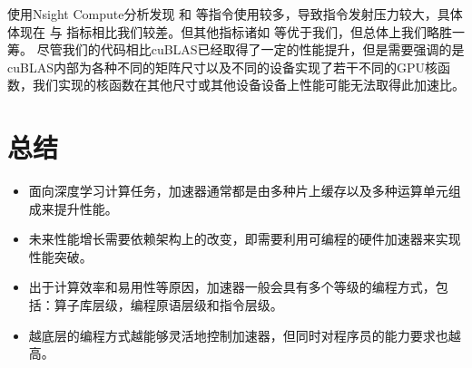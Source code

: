 \documentclass[letterpaper,10pt,english]{sphinxmanual}
\begin{document}
\begin{sphinxVerbatim}[commandchars=\\\{\}]
  
      
\end{sphinxVerbatim}

\sphinxAtStartPar
使用Nsight Compute分析发现  和 
等指令使用较多，导致指令发射压力较大，具体体现在  与
 指标相比我们较差。但其他指标诸如
 等优于我们，但总体上我们略胜一筹。
尽管我们的代码相比cuBLAS已经取得了一定的性能提升，但是需要强调的是cuBLAS内部为各种不同的矩阵尺寸以及不同的设备实现了若干不同的GPU核函数，我们实现的核函数在其他尺寸或其他设备设备上性能可能无法取得此加速比。


\section{总结}
\label{\detokenize{chapter_accelerator/summary:id1}}\label{\detokenize{chapter_accelerator/summary::doc}}\begin{itemize}
\item {} 
\sphinxAtStartPar
面向深度学习计算任务，加速器通常都是由多种片上缓存以及多种运算单元组成来提升性能。

\item {} 
\sphinxAtStartPar
未来性能增长需要依赖架构上的改变，即需要利用可编程的硬件加速器来实现性能突破。

\item {} 
\sphinxAtStartPar
出于计算效率和易用性等原因，加速器一般会具有多个等级的编程方式，包括：算子库层级，编程原语层级和指令层级。

\item {} 
\sphinxAtStartPar
越底层的编程方式越能够灵活地控制加速器，但同时对程序员的能力要求也越高。

\end{itemize}
\end{document}
